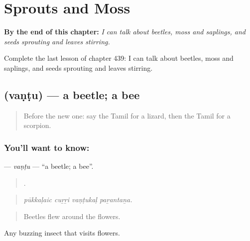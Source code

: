 
\chapter{Sprouts and Moss}
\label{ch:ta-sprouts-and-moss}

\begin{chapteropening}
\textbf{By the end of this chapter:} \emph{I can talk about beetles, moss and saplings, and seeds sprouting and leaves stirring.}

Complete the last lesson of chapter 439: I can talk about beetles, moss and saplings, and seeds sprouting and leaves stirring.
\end{chapteropening}

\section[\texorpdfstring{\ta{வண்டு} (vaṇṭu)}{வண்டு (vaṇṭu)}]{ (vaṇṭu) — a beetle; a bee}

\label{lesson:TA-C439-vantu}



\begin{quote}
Before the new one: say the Tamil for a lizard, then the Tamil for a scorpion.
\end{quote}

\subsection*{You'll want to know: }
\textbf{} — \emph{vaṇṭu} — \textquotedblleft{}a beetle; a bee\textquotedblright{}.

\begin{quote}
   .
\end{quote}

\begin{quote}
\emph{pūkkaḷaic cuṟṟi vaṇṭukaḷ paṟantaṉa.}
\end{quote}

\begin{quote}
Beetles flew around the flowers.
\end{quote}

Any buzzing insect that visits flowers.

